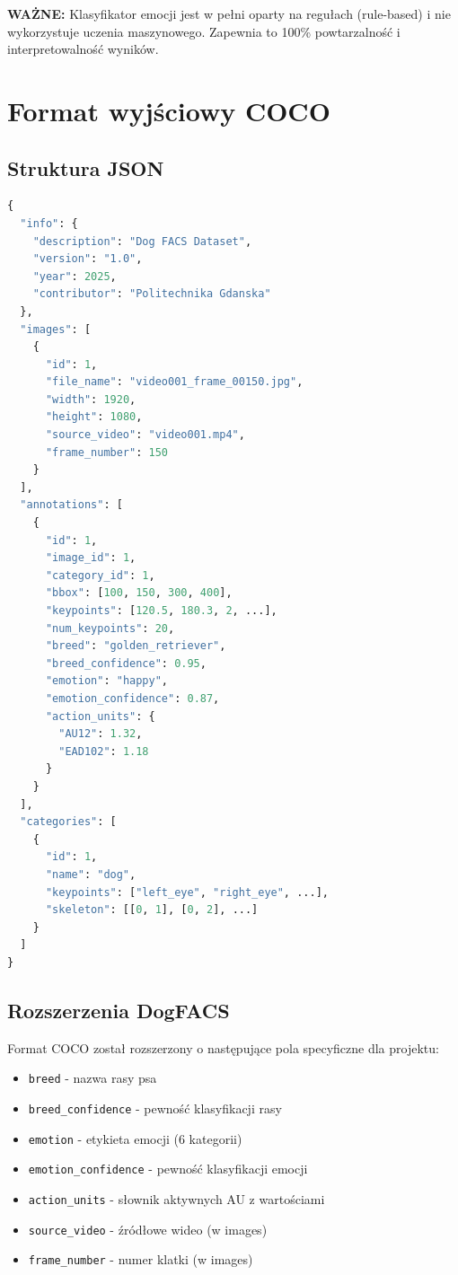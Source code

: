 \documentclass[12pt,a4paper]{article}
\begin{document}
\textbf{WAŻNE:} Klasyfikator emocji jest w pełni oparty na regułach (rule-based) i nie wykorzystuje uczenia maszynowego. Zapewnia to 100\% powtarzalność i interpretowalność wyników.

\section{Format wyjściowy COCO}

\subsection{Struktura JSON}

\begin{lstlisting}[language=Python, caption=Przykład formatu COCO]
{
  "info": {
    "description": "Dog FACS Dataset",
    "version": "1.0",
    "year": 2025,
    "contributor": "Politechnika Gdanska"
  },
  "images": [
    {
      "id": 1,
      "file_name": "video001_frame_00150.jpg",
      "width": 1920,
      "height": 1080,
      "source_video": "video001.mp4",
      "frame_number": 150
    }
  ],
  "annotations": [
    {
      "id": 1,
      "image_id": 1,
      "category_id": 1,
      "bbox": [100, 150, 300, 400],
      "keypoints": [120.5, 180.3, 2, ...],
      "num_keypoints": 20,
      "breed": "golden_retriever",
      "breed_confidence": 0.95,
      "emotion": "happy",
      "emotion_confidence": 0.87,
      "action_units": {
        "AU12": 1.32,
        "EAD102": 1.18
      }
    }
  ],
  "categories": [
    {
      "id": 1,
      "name": "dog",
      "keypoints": ["left_eye", "right_eye", ...],
      "skeleton": [[0, 1], [0, 2], ...]
    }
  ]
}
\end{lstlisting}

\subsection{Rozszerzenia DogFACS}

Format COCO został rozszerzony o następujące pola specyficzne dla projektu:

\begin{itemize}
    \item \texttt{breed} - nazwa rasy psa
    \item \texttt{breed\_confidence} - pewność klasyfikacji rasy
    \item \texttt{emotion} - etykieta emocji (6 kategorii)
    \item \texttt{emotion\_confidence} - pewność klasyfikacji emocji
    \item \texttt{action\_units} - słownik aktywnych AU z wartościami
    \item \texttt{source\_video} - źródłowe wideo (w images)
    \item \texttt{frame\_number} - numer klatki (w images)
\end{itemize}
\end{document}
